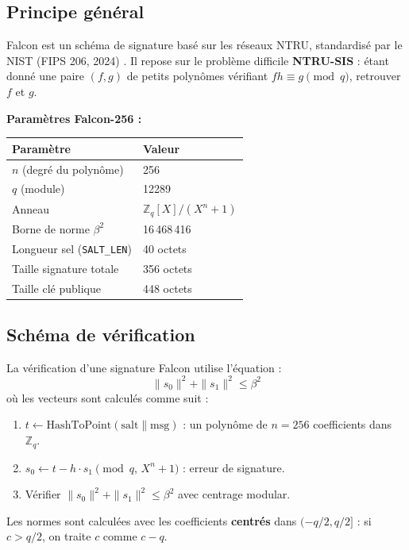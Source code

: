\documentclass[11pt,a4paper]{article}
\newcommand{\Zq}{\mathbb{Z}_{q}}
\newcommand{\ring}{\mathbb{Z}_q[X]/(X^n+1)}
\begin{document}
\subsection{Principe général}

Falcon est un schéma de signature basé sur les réseaux NTRU, standardisé par
le NIST (FIPS 206, 2024) \cite{NIST_PQC}. Il repose sur le problème difficile
\textbf{NTRU-SIS} : étant donné une paire $(f,g)$ de petits polynômes vérifiant
$fh \equiv g \pmod{q}$, retrouver $f$ et $g$.

\textbf{Paramètres Falcon-256 :}
\begin{center}
\begin{tabular}{ll}
\toprule
Paramètre & Valeur \\
\midrule
$n$ (degré du polynôme)        & 256 \\
$q$ (module)                   & 12289 \\
Anneau                         & $\ring$ \\
Borne de norme $\beta^2$       & 16\,468\,416 \\
Longueur sel (\texttt{SALT\_LEN}) & 40 octets \\
Taille signature totale        & 356 octets \\
Taille clé publique            & 448 octets \\
\bottomrule
\end{tabular}
\end{center}

\subsection{Schéma de vérification}

La vérification d'une signature Falcon utilise l'équation :
\[
  \|s_0\|^2 + \|s_1\|^2 \leq \beta^2
\]
où les vecteurs sont calculés comme suit :
\begin{enumerate}
  \item $t \leftarrow \mathrm{HashToPoint}(\mathrm{salt} \| \mathrm{msg})$ : un
        polynôme de $n=256$ coefficients dans $\Zq$.
  \item $s_0 \leftarrow t - h \cdot s_1 \pmod{q,\, X^n+1}$ : erreur de signature.
  \item Vérifier $\|s_0\|^2 + \|s_1\|^2 \leq \beta^2$ avec centrage modular.
\end{enumerate}

Les normes sont calculées avec les coefficients \textbf{centrés} dans
$(-q/2, q/2]$ : si $c > q/2$, on traite $c$ comme $c - q$.
\end{document}
